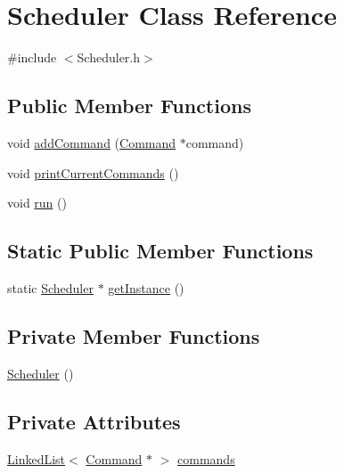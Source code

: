 \hypertarget{classScheduler}{\section{Scheduler Class Reference}
\label{classScheduler}
}


{\ttfamily \#include $<$Scheduler.\-h$>$}

\subsection*{Public Member Functions}
\begin{DoxyCompactItemize}
\item 
void \hyperlink{classScheduler_a73f2e49a61315d8138cfce5b180fd891}{add\-Command} (\hyperlink{classCommand}{Command} $\ast$command)
\item 
void \hyperlink{classScheduler_ae8637bc50162682e59b6b26a3b85e28d}{print\-Current\-Commands} ()
\item 
void \hyperlink{classScheduler_a58fba108ce2748870a6288cd6f5fd1e3}{run} ()
\end{DoxyCompactItemize}
\subsection*{Static Public Member Functions}
\begin{DoxyCompactItemize}
\item 
static \hyperlink{classScheduler}{Scheduler} $\ast$ \hyperlink{classScheduler_a3fc3905ac5589d51e464100f3b8c0138}{get\-Instance} ()
\end{DoxyCompactItemize}
\subsection*{Private Member Functions}
\begin{DoxyCompactItemize}
\item 
\hyperlink{classScheduler_a3b61aac11466cd45ae42ab8c2b0013f6}{Scheduler} ()
\end{DoxyCompactItemize}
\subsection*{Private Attributes}
\begin{DoxyCompactItemize}
\item 
\hyperlink{classLinkedList}{Linked\-List}$<$ \hyperlink{classCommand}{Command} $\ast$ $>$ \hyperlink{classScheduler_ad320e81fdf3a591b1f1d638f8fa5065d}{commands}
\end{DoxyCompactItemize}
